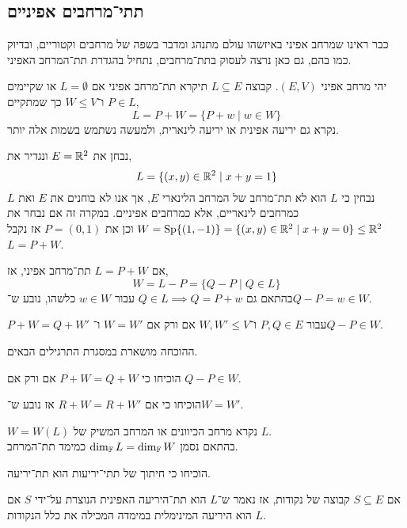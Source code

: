\subsection{תתי־מרחבים אפיניים}
כבר ראינו שמרחב אפיני באיזשהו עולם מתנהג ומדבר בשפה של מרחבים וקטוריים, ובדיוק כמו בהם, גם כאן נרצה לעסוק בתת־מרחבים, נתחיל בהגדרת תת־המרחב האפיני.
\begin{definition}
	יהי מרחב אפיני $(E, V)$.
	קבוצה $L \subseteq E$ תיקרא תת־מרחב אפיני אם $L = \emptyset$ או שקיימים $P \in L$ ו־$W \le V$ כך שמתקיים,
	\[
		L
		= P + W
		= \{ P + w \mid w \in W \}
	\]
	נקרא גם יריעה אפינית או יריעה לינארית, ולמעשה נשתמש בשמות אלה יותר.
\end{definition}
\begin{example}
	נבחן את $E = \mathbb{R}^2$ ונגדיר את,
	\[
		L = \{ (x, y) \in \mathbb{R}^2 \mid x + y = 1 \}
	\]
	נבחין כי $L$ הוא לא תת־מרחב של המרחב הלינארי $E$, אך אנו לא בוחנים את $E$ ואת $L$ כמרחבים לינאריים, אלא כמרחבים אפיניים.
	במקרה זה אם נבחר את $W = \operatorname{Sp}\{ (1, -1) \} = \{ (x, y) \in \mathbb{R}^2 \mid x + y = 0 \} \le \mathbb{R}^2$ וכן את $P = (0, 1)$ אז נקבל $L = P + W$.
\end{example}
\begin{remark}
	אם $L = P + W$ תת־מרחב אפיני, אז,
	\[
		W
		= L - P
		= \{ Q - P \mid Q \in L \}
	\]
	בהתאם גם $Q \in L \implies Q = P + w$ עבור $w \in W$ כלשהו, נובע ש־$Q - P = w \in W$.
\end{remark}
\begin{theorem}
	$P + W = Q + W'$ עבור $P, Q \in E$ ו־$W, W' \le V$ אם ורק אם $W = W'$ ו־$Q - P \in W$.
\end{theorem}
ההוכחה מושארת במסגרת התרגילים הבאים.
\begin{exercise}
	הוכיחו כי $P + W = Q + W$ אם ורק אם $Q - P \in W$.
\end{exercise}
\begin{exercise}
	הוכיחו כי אם $R + W = R + W'$ אז נובע ש־$W = W'$.
\end{exercise}
\begin{definition}
	$W = W(L)$ נקרא מרחב הכיוונים או המרחב המשיק של $L$. \\
	בהתאם נסמן $\dim_{\mathbb{F}} L = \dim_{\mathbb{F}} W$ כמימד תת־המרחב.
\end{definition}
\begin{exercise}
	הוכיחו כי חיתוך של תתי־יריעות הוא תת־יריעה.
\end{exercise}
\begin{definition}
	אם $S \subseteq E$ קבוצה של נקודות, אז נאמר ש־$L$ הוא תת־היריעה האפינית הנוצרת על־ידי $S$ אם $L$ הוא היריעה המינימלית במימדה המכילה את כלל הנקודות.
\end{definition}
